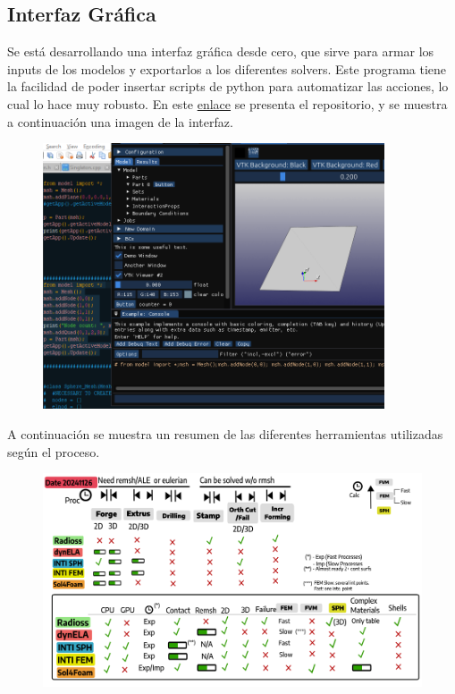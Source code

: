 \documentclass{article}
\begin{document}
\subsection{Interfaz Gráfica}
Se está desarrollando una interfaz gráfica desde cero, que sirve para armar los inputs de los modelos y exportarlos a los diferentes solvers. Este programa tiene la facilidad de poder insertar scripts de python para automatizar las acciones, lo cual lo hace muy robusto. En este \href{https://github.com/luchete80/WeldFormGUI}{enlace} se presenta el repositorio, y se muestra a continuación una imagen de la interfaz.
\\
\begin{figure}
\includegraphics[width=0.9\textwidth]{images/20241114.png}
\end{figure}

A continuación se muestra un resumen de las diferentes herramientas utilizadas según el proceso. 

\begin{figure}
\includegraphics[width=1.0\textwidth]{images/20241126_Tools.png}
\end{figure}
\end{document}

